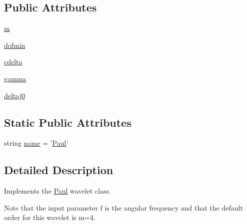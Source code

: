 \subsection*{Public Attributes}
\begin{DoxyCompactItemize}
\item 
\hyperlink{classprojects_1_1piwavelet_1_1piwavelet_1_1piwavelet_1_1Paul_aea3aeefe8f36c30c1de347826dc87f20}{m}
\item 
\hyperlink{classprojects_1_1piwavelet_1_1piwavelet_1_1piwavelet_1_1Paul_af40454db2c5e1e1f271b1833b89a4c05}{dofmin}
\item 
\hyperlink{classprojects_1_1piwavelet_1_1piwavelet_1_1piwavelet_1_1Paul_a081da896e5795419bd598377e7d35363}{cdelta}
\item 
\hyperlink{classprojects_1_1piwavelet_1_1piwavelet_1_1piwavelet_1_1Paul_a3c06d8e4a4f59cefc7def3b717269658}{gamma}
\item 
\hyperlink{classprojects_1_1piwavelet_1_1piwavelet_1_1piwavelet_1_1Paul_a314ca9ce9505b5a494531cc6c64d1a46}{deltaj0}
\end{DoxyCompactItemize}
\subsection*{Static Public Attributes}
\begin{DoxyCompactItemize}
\item 
string \hyperlink{classprojects_1_1piwavelet_1_1piwavelet_1_1piwavelet_1_1Paul_a60de3ab0c84738469f7002fa61e77bac}{name} = '\hyperlink{classprojects_1_1piwavelet_1_1piwavelet_1_1piwavelet_1_1Paul}{Paul}'
\end{DoxyCompactItemize}


\subsection{Detailed Description}
Implements the \hyperlink{classprojects_1_1piwavelet_1_1piwavelet_1_1piwavelet_1_1Paul}{Paul} wavelet class. 

Note that the input parameter f is the angular frequency and that the default order for this wavelet is m=4. 

